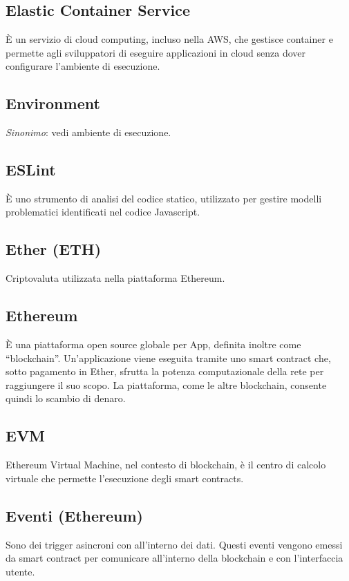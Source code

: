 \section[E]{}
	\subsection*{Elastic Container Service}
	È un servizio di cloud computing, incluso nella AWS, che gestisce container e permette agli sviluppatori di eseguire applicazioni in cloud senza dover configurare l’ambiente di esecuzione. 
	\subsection*{Environment}
	\emph{Sinonimo}: vedi ambiente di esecuzione.
	\subsection*{ESLint}
	È uno strumento di analisi del codice statico, utilizzato per gestire modelli problematici identificati nel codice Javascript.
	\subsection*{Ether (ETH)}
	Criptovaluta utilizzata nella piattaforma Ethereum.
	\subsection*{Ethereum}
	È una piattaforma open source globale per \DJ{}App, definita inoltre come “blockchain”. Un’applicazione viene eseguita tramite uno smart contract che, sotto pagamento in Ether, sfrutta la potenza computazionale della rete per raggiungere il suo scopo. La piattaforma, come le altre blockchain, consente quindi lo scambio di denaro.
	\subsection*{EVM}
	Ethereum Virtual Machine, nel contesto di blockchain, è il centro di calcolo virtuale che permette l’esecuzione degli smart contracts.
	\subsection*{Eventi (Ethereum)}
	Sono dei trigger asincroni con all’interno dei dati. Questi eventi vengono emessi da smart contract per comunicare all’interno della blockchain e con l’interfaccia utente.
